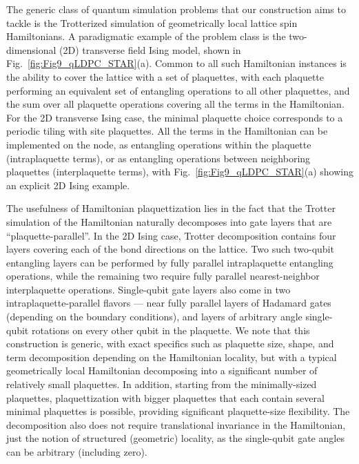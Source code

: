 \documentclass[aps, prx, reprint, superscriptaddress, longbibliography, floatfix]{revtex4-2}
\begin{document}
The generic class of quantum simulation problems that our construction aims to tackle is the Trotterized simulation of geometrically local lattice spin Hamiltonians. A paradigmatic example of the problem class is the two-dimensional (2D) transverse field Ising model, shown in Fig.~\ref{fig:Fig9_qLDPC_STAR}(a). Common to all such Hamiltonian instances is the ability to cover the lattice with a set of plaquettes, with each plaquette performing an equivalent set of entangling operations to all other plaquettes, and the sum over all plaquette operations covering all the terms in the Hamiltonian. For the 2D transverse Ising case, the minimal plaquette choice corresponds to a periodic tiling with site plaquettes. All the terms in the Hamiltonian can be implemented on the node, as entangling operations within the plaquette (intraplaquette terms), or as entangling operations between neighboring plaquettes (interplaquette terms), with Fig.~\ref{fig:Fig9_qLDPC_STAR}(a) showing an explicit 2D Ising example.

The usefulness of Hamiltonian plaquettization lies in the fact that the Trotter simulation of the Hamiltonian naturally decomposes into gate layers that are ``plaquette-parallel''. In the 2D Ising case, Trotter decomposition contains four layers covering each of the bond directions on the lattice. Two such two-qubit entangling layers can be performed by fully parallel intraplaquette entangling operations, while the remaining two require fully parallel nearest-neighbor interplaquette operations. Single-qubit gate layers also come in two intraplaquette-parallel flavors --- near fully parallel layers of Hadamard gates (depending on the boundary conditions), and layers of arbitrary angle single-qubit rotations on every other qubit in the plaquette. We note that this construction is generic, with exact specifics such as plaquette size, shape, and term decomposition depending on the Hamiltonian locality, but with a typical geometrically local Hamiltonian decomposing into a significant number of relatively small plaquettes. In addition, starting from the minimally-sized plaquettes, plaquettization with bigger plaquettes that each contain several minimal plaquettes is possible, providing significant plaquette-size flexibility. The decomposition also does not require translational invariance in the Hamiltonian, just the notion of structured (geometric) locality, as the single-qubit gate angles can be arbitrary (including zero).
\end{document}
